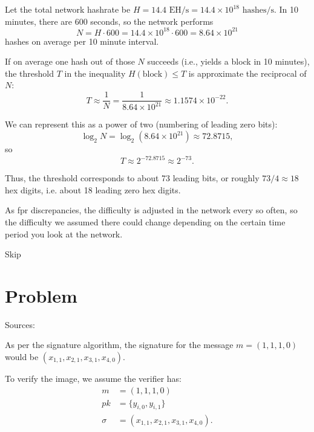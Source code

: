 \documentclass[11pt]{article}
\begin{document}
\begin{p}\end{p}
Let the total network hashrate be $H = 14.4 \text{ EH/s} = 14.4 \times 10^{18} \text{ hashes/s}$. In 10 minutes, there are 600 seconds, so the network performs
\begin{equation}
    N = H \cdot 600 = 14.4 \times 10^{18} \cdot 600 = 8.64 \times 10^{21}
\end{equation}
hashes on average per 10 minute interval.

If on average one hash out of those $N$ succeeds (i.e., yields a block in 10 minutes), the threshold $T$ in the inequality $H(\text{block}) \leq T$ is approximate the reciprocal of $N$:
\begin{equation}
    T \approx \frac{1}{N} = \frac{1}{8.64 \times 10^{21}} \approx 1.1574 \times 10^{-22}.
\end{equation}

We can represent this as a power of two (numbering of leading zero bits):
\begin{equation}
    \log_{2}{N} = \log_{2}(8.64 \times 10^{21}) \approx 72.8715,
\end{equation}
so
\begin{equation}
    T \approx 2^{-72.8715} \approx 2^{-73}.
\end{equation}

Thus, the threshold corresponds to about 73 leading bits, or roughly $73 / 4 \approx 18$ hex digits, i.e. about 18 leading zero hex digits.

As fpr discrepancies, the difficulty is adjusted in the network every so often, so the difficulty we assumed there could change depending on the certain time period you look at the network.

\begin{p}
Skip
\end{p}


\section{Problem}
Sources: \cite{wikipediaLamportSignature}

\begin{p} \end{p}
As per the signature algorithm, the signature for the message $m = (1,1,1,0)$ would be \break $(x_{1,1}, x_{2,1}, x_{3,1}, x_{4,0})$.

To verify the image, we assume the verifier has:
\begin{align*}
    m &= (1,1,1,0) \\
    pk &= \{y_{i,0}, y_{i,1}\} \\
    \sigma &= (x_{1,1}, x_{2,1}, x_{3,1}, x_{4,0}).
\end{align*}
\end{document}
